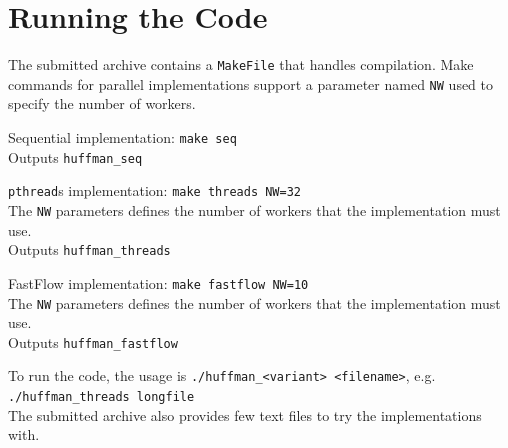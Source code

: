\documentclass[10pt]{article}
\begin{document}
\section{Running the Code}
The submitted archive contains a \texttt{MakeFile} that handles compilation. Make commands for parallel implementations support a parameter named \texttt{NW} used to specify the number of workers.
\begin{list}{}{}
	\item Sequential implementation: \texttt{make seq}\\
	Outputs \texttt{huffman\_seq}
	\item \texttt{pthread}s implementation: \texttt{make threads NW=32}\\
	The \texttt{NW} parameters defines the number of workers that the implementation must use.\\
	Outputs \texttt{huffman\_threads}
	\item FastFlow implementation: \texttt{make fastflow NW=10}\\
	The \texttt{NW} parameters defines the number of workers that the implementation must use.\\
	Outputs \texttt{huffman\_fastflow}
\end{list}
To run the code, the usage is \texttt{./huffman\_<variant> <filename>}, e.g. \texttt{./huffman\_threads longfile}\\
The submitted archive also provides few text files to try the implementations with.
\end{document}
